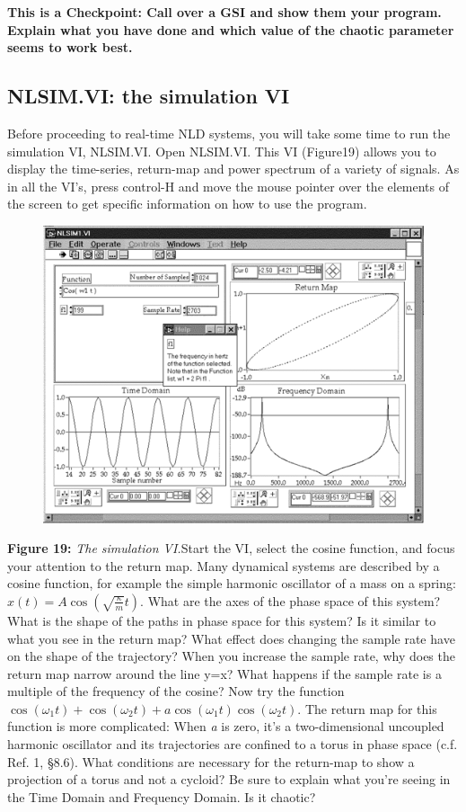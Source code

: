 \documentclass{../lab}
\begin{document}
\textbf{ This is a Checkpoint: Call over a GSI and show them your program. Explain what you have done and which value of the chaotic parameter seems to work best. }

\subsection{NLSIM.VI: the simulation VI}

Before proceeding to real-time NLD systems, you will take some time to run the simulation VI, NLSIM.VI. Open NLSIM.VI. This VI (Figure19) allows you to display the time-series, return-map and power spectrum of a variety of signals. As in all the VI's, press control-H and move the mouse pointer over the elements of the screen to get specific information on how to use the program.


\begin{figure}[h]
    \centering
    \href{http://experimentationlab.berkeley.edu/sites/default/files/images/Nldimage109.gif}{\includegraphics[width=0.5\linewidth]{images/Nldimage109.png}}
    \caption{}
    \label{fig:Nldimage109}
\end{figure}

\textbf{Figure 19:} \emph{The simulation VI.}Start the VI, select the cosine function, and focus your attention to the return map. Many dynamical systems are described by a cosine function, for example the simple harmonic oscillator of a mass on a spring: $ x(t)=A\cos {(\sqrt{\frac{\kappa}{m}}t)} $. What are the axes of the phase space of this system? What is the shape of the paths in phase space for this system? Is it similar to what you see in the return map? What effect does changing the sample rate have on the shape of the trajectory? When you increase the sample rate, why does the return map narrow around the line y=x? What happens if the sample rate is a multiple of the frequency of the cosine? Now try the function  $ \cos {(\omega_1t)}+\cos {(\omega_2t)}+a\cos {(\omega_1t)}\cos {(\omega_2t)} $. The return map for this function is more complicated: When \emph{a} is zero, it's a two-dimensional uncoupled harmonic oscillator and its trajectories are confined to a torus in phase space (c.f. Ref. 1, §8.6). What conditions are necessary for the return-map to show a projection of a torus and not a cycloid? Be sure to explain what you're seeing in the Time Domain and Frequency Domain. Is it chaotic?
\end{document}
